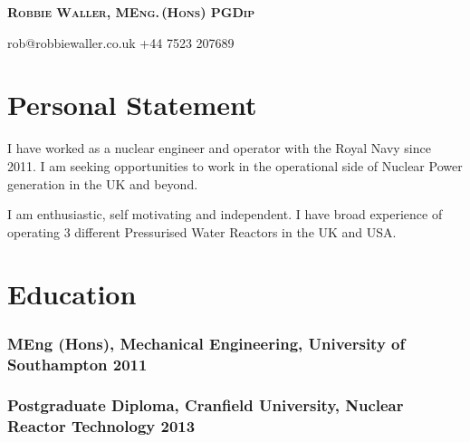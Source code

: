 \documentclass[a4paper, oneside, final, 11pt]{scrartcl} %
\begin{document}


{\fontsize{21}{21}\bfseries\scshape{Robbie Waller, MEng.\,(Hons) PGDip}} %

\bigskip

\faEnvelopeO \space rob@robbiewaller.co.uk \hfill  \faMobile \space +44 7523 207689

\medskip

\section{Personal Statement}

I have worked as a nuclear engineer and operator with the Royal Navy since 2011. I am seeking opportunities to work in the operational side of Nuclear Power generation in the UK and beyond. 

I am enthusiastic, self motivating and independent. I have broad experience  of operating 3 different
Pressurised Water Reactors in the UK and USA. 


\section{Education}

\subsubsection*{MEng (Hons), Mechanical Engineering, University of Southampton \hfill 2011}  

\bigskip

\subsubsection*{Postgraduate Diploma, Cranfield University, Nuclear Reactor Technology \hfill 2013}  

\bigskip
\end{document}

